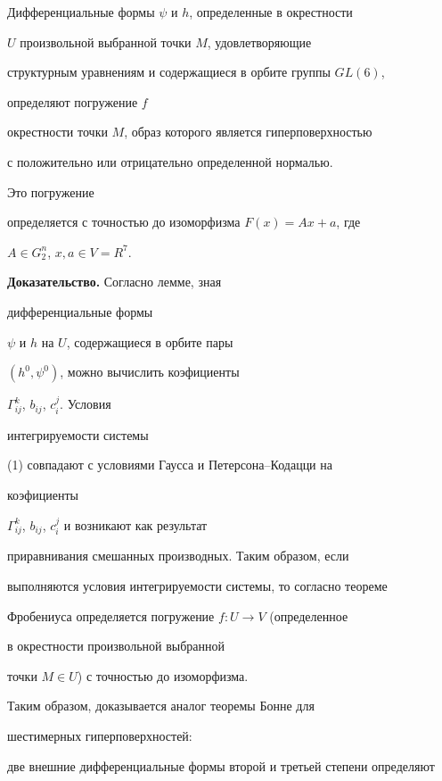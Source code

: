 \begin{thm}


Дифференциальные формы $\psi$ и $h$, определенные в окрестности


$U$ произвольной выбранной точки $M$, удовлетворяющие


структурным уравнениям и содержащиеся в орбите группы $GL(6)$,


определяют погружение $f$


окрестности точки $M$, образ которого является гиперповерхностью


с положительно или отрицательно определенной нормалью.


Это погружение


определяется с точностью до изоморфизма $F(x)=Ax+a$, где


$A\in G_2^n$, $x,a\in V=R^7$.


\end{thm}








{\bf Доказательство.} Согласно лемме, зная


дифференциальные формы


$\psi$ и $h$ на $U$, содержащиеся в орбите пары


$(h^0, \psi ^0)$, можно вычислить коэфициенты


$\Gamma^k_{ij}$, $b_{ij}$, $c_{i}^{j}$. Условия


интегрируемости системы


(1) совпадают с условиями Гаусса и Петерсона--Кодацци на


коэфициенты


$\Gamma^k_{ij}$, $b_{ij}$, $c_{i}^{j}$ и возникают как результат


приравнивания смешанных производных. Таким образом, если


выполняются условия интегрируемости системы, то согласно теореме


Фробениуса определяется погружение $f:U\rightarrow V$ (определенное


в окрестности произвольной выбранной


точки $M\in U$) с точностью до изоморфизма.





Таким образом, доказывается аналог теоремы Бонне для


шестимерных гиперповерхностей:


две внешние дифференциальные формы второй и третьей степени определяют


